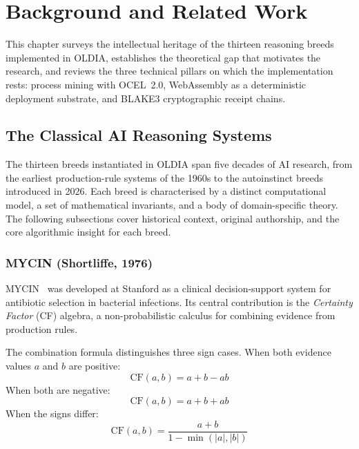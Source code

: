 \chapter{Background and Related Work}
\label{chap:background}

This chapter surveys the intellectual heritage of the thirteen reasoning breeds
implemented in OLDIA, establishes the theoretical gap that motivates the
research, and reviews the three technical pillars on which the implementation
rests: process mining with OCEL~2.0, WebAssembly as a deterministic deployment
substrate, and BLAKE3 cryptographic receipt chains.

\section{The Classical AI Reasoning Systems}
\label{sec:classical-ai}

The thirteen breeds instantiated in OLDIA span five decades of AI research,
from the earliest production-rule systems of the 1960s to the autoinstinct
breeds introduced in 2026.  Each breed is characterised by a distinct
computational model, a set of mathematical invariants, and a body of
domain-specific theory.  The following subsections cover historical context,
original authorship, and the core algorithmic insight for each breed.

\subsection{MYCIN (Shortliffe, 1976)}
\label{subsec:mycin}

MYCIN~\cite{shortliffe1976} was developed at Stanford as a clinical
decision-support system for antibiotic selection in bacterial infections.  Its
central contribution is the \emph{Certainty Factor} (CF) algebra, a
non-probabilistic calculus for combining evidence from production rules.

The combination formula distinguishes three sign cases.  When both evidence
values $a$ and $b$ are positive:
\begin{equation}
  \mathrm{CF}(a,b) = a + b - ab
  \label{eq:cf-pos}
\end{equation}
When both are negative:
\begin{equation}
  \mathrm{CF}(a,b) = a + b + ab
  \label{eq:cf-neg}
\end{equation}
When the signs differ:
\begin{equation}
  \mathrm{CF}(a,b) = \frac{a + b}{1 - \min(|a|,|b|)}
  \label{eq:cf-mixed}
\end{equation}

